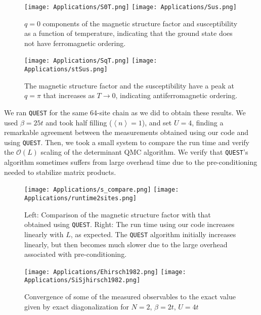 \begin{figure}[H]\label{fig:Schi0}
\texttt{[image: Applications/S0T.png]}
\hspace{-0.5cm}
\texttt{[image: Applications/Sus.png]}
\caption[$q=0$ components of the magnetic structure factor and susceptibility as a function of temperature, indicating that the ground state does not have ferromagnetic ordering.]{$q=0$ components of the magnetic structure factor and susceptibility as a function of temperature, indicating that the ground state does not have ferromagnetic ordering.}
\end{figure}
\vspace{-0.5cm}
\begin{figure}[H]\label{fig:SchiPi}
\texttt{[image: Applications/SqT.png]}
\hspace{-0.5cm}
\texttt{[image: Applications/stSus.png]}
\caption[The magnetic structure factor and the  susceptibility have a peak at $q = \pi$ that increases as $T\rightarrow 0$, indicating \emph{antiferromagnetic ordering}.]{The magnetic structure factor and the susceptibility have a peak at $q = \pi$ that increases as $T\rightarrow 0$, indicating antiferromagnetic ordering.}
\end{figure}

We ran \texttt{QUEST} for the same 64-site chain as we did to obtain these results.
We used $\beta = 25 t$ and took half filling ($\left\langle n \right\rangle = 1$), and set $U = 4$, finding a remarkable agreement between the measurements obtained using our code and using \texttt{QUEST}.
Then, we took a small system to compare the run time and verify the $\mathcal{O}(L)$ scaling of the determinant \ac{QMC} algorithm.
We verify that \texttt{QUEST}'s algorithm sometimes suffers from large overhead time due to the pre-conditioning needed to stabilize matrix products.

\begin{figure}[H]\label{fig:quest_time}
\texttt{[image: Applications/s\_compare.png]}
\hspace{-0.5cm}
\texttt{[image: Applications/runtime2sites.png]}
\caption[Comparison of the magnetic structure factor with that obtained using \texttt{QUEST}. Run time comparison.]{Left: Comparison of the magnetic structure factor with that obtained using \texttt{QUEST}.
Right: The run time using our code increases linearly with $L$, as expected.
The \texttt{QUEST} algorithm initially increases linearly, but then becomes much slower due to the large overhead associated with pre-conditioning.}
\end{figure}
\vspace{-0.5cm}
\begin{figure}[H]\label{fig:hirsch1982}
\texttt{[image: Applications/Ehirsch1982.png]}
\hspace{-0.5cm}
\texttt{[image: Applications/SiSjhirsch1982.png]}
\caption[]{Convergence of some of the measured observables to the exact value given by exact diagonalization for $N=2$, $\beta = 2 t$, $U = 4 t$}
\end{figure}
